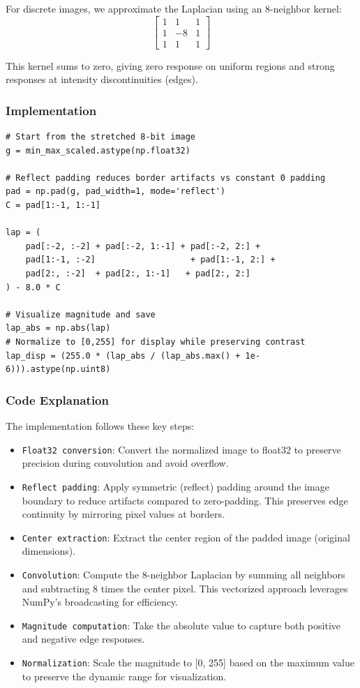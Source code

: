 \documentclass[a4paper,12pt]{article}
\begin{document}
For discrete images, we approximate the Laplacian using an 8-neighbor kernel:
\[
\begin{bmatrix}
1 & 1 & 1 \\
1 & -8 & 1 \\
1 & 1 & 1
\end{bmatrix}
\]

This kernel sums to zero, giving zero response on uniform regions and strong responses at intensity discontinuities (edges).

\subsubsection{Implementation}
\begin{lstlisting}[style=pystyle, caption={Vectorized NumPy Laplacian with reflect padding}, label={lst:lap}]
# Start from the stretched 8-bit image
g = min_max_scaled.astype(np.float32)

# Reflect padding reduces border artifacts vs constant 0 padding
pad = np.pad(g, pad_width=1, mode='reflect')
C = pad[1:-1, 1:-1]

lap = (
    pad[:-2, :-2] + pad[:-2, 1:-1] + pad[:-2, 2:] +
    pad[1:-1, :-2]                   + pad[1:-1, 2:] +
    pad[2:, :-2]  + pad[2:, 1:-1]   + pad[2:, 2:]
) - 8.0 * C

# Visualize magnitude and save
lap_abs = np.abs(lap)
# Normalize to [0,255] for display while preserving contrast
lap_disp = (255.0 * (lap_abs / (lap_abs.max() + 1e-6))).astype(np.uint8)
\end{lstlisting}

\subsubsection{Code Explanation}
The implementation follows these key steps:
\begin{itemize}
    \item \texttt{Float32 conversion}: Convert the normalized image to float32 to preserve precision during convolution and avoid overflow.
    \item \texttt{Reflect padding}: Apply symmetric (reflect) padding around the image boundary to reduce artifacts compared to zero-padding. This preserves edge continuity by mirroring pixel values at borders.
    \item \texttt{Center extraction}: Extract the center region of the padded image (original dimensions).
    \item \texttt{Convolution}: Compute the 8-neighbor Laplacian by summing all neighbors and subtracting 8 times the center pixel. This vectorized approach leverages NumPy's broadcasting for efficiency.
    \item \texttt{Magnitude computation}: Take the absolute value to capture both positive and negative edge responses.
    \item \texttt{Normalization}: Scale the magnitude to [0, 255] based on the maximum value to preserve the dynamic range for visualization.
\end{itemize}
\end{document}
